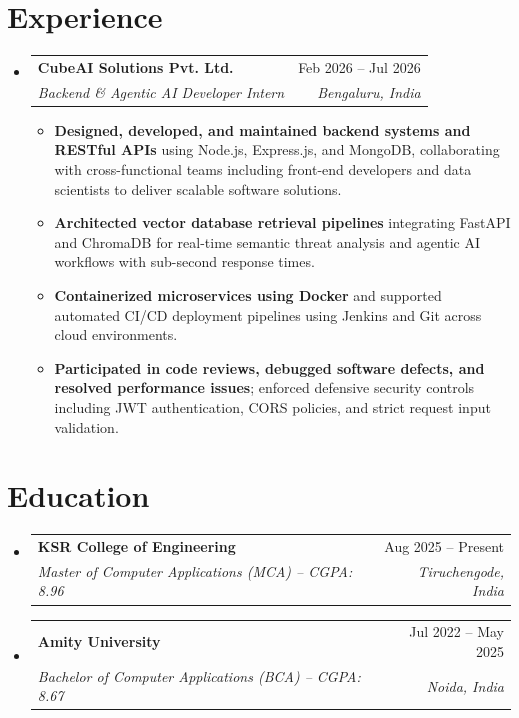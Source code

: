 \documentclass[letterpaper,10pt]{article}
\makeatletter
\newcommand{\resumeItem}[1]{
  \item\small{
    {#1 \vspace{-2pt}}
  }
}
\newcommand{\resumeSubheading}[4]{
  \vspace{-2pt}\item
    \begin{tabular*}{0.98\textwidth}[t]{l@{\extracolsep{\fill}}r}
      \textbf{#1} & #2 \\
      \textit{\small#3} & \textit{\small #4} \\
    \end{tabular*}\vspace{-4pt}
}
\newcommand{\resumeSubHeadingListStart}{\begin{itemize}[leftmargin=0.15in, label={}]}
\newcommand{\resumeSubHeadingListEnd}{\end{itemize}}
\newcommand{\resumeItemListStart}{\begin{itemize}[leftmargin=0.15in]}
\newcommand{\resumeItemListEnd}{\end{itemize}\vspace{-4pt}}
\makeatother
\begin{document}
\section{Experience}
  \resumeSubHeadingListStart
    \resumeSubheading
      {CubeAI Solutions Pvt. Ltd.}{Feb 2026 -- Jul 2026}
      {Backend \& Agentic AI Developer Intern}{Bengaluru, India}
      \resumeItemListStart
        \resumeItem{\textbf{Designed, developed, and maintained backend systems and RESTful APIs} using Node.js, Express.js, and MongoDB, collaborating with cross-functional teams including front-end developers and data scientists to deliver scalable software solutions.}
        \resumeItem{\textbf{Architected vector database retrieval pipelines} integrating FastAPI and ChromaDB for real-time semantic threat analysis and agentic AI workflows with sub-second response times.}
        \resumeItem{\textbf{Containerized microservices using Docker} and supported automated CI/CD deployment pipelines using Jenkins and Git across cloud environments.}
        \resumeItem{\textbf{Participated in code reviews, debugged software defects, and resolved performance issues}; enforced defensive security controls including JWT authentication, CORS policies, and strict request input validation.}
      \resumeItemListEnd
  \resumeSubHeadingListEnd
\vspace{-6pt}

\section{Education}
  \resumeSubHeadingListStart
    \resumeSubheading
      {KSR College of Engineering}{Aug 2025 -- Present}
      {Master of Computer Applications (MCA) -- CGPA: 8.96}{Tiruchengode, India}
    \resumeSubheading
      {Amity University}{Jul 2022 -- May 2025}
      {Bachelor of Computer Applications (BCA) -- CGPA: 8.67}{Noida, India}
  \resumeSubHeadingListEnd
\vspace{-6pt}

\end{document}
